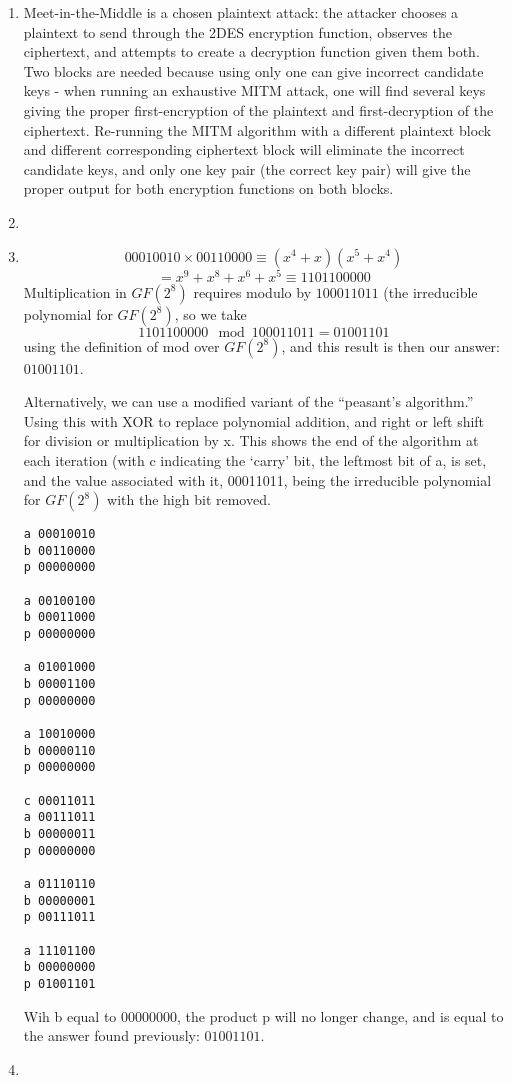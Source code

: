\documentclass[12pt,letterpaper]{article}
\begin{document}
\pagestyle{fancy}
\rhead{\today}

\begin{enumerate}

    \item
        Meet-in-the-Middle is a chosen plaintext attack: the attacker chooses a plaintext to send through the 2DES encryption function, observes the ciphertext, and attempts to create a decryption function given them both.
        Two blocks are needed because using only one can give incorrect candidate keys - when running an exhaustive MITM attack, one will find several keys giving the proper first-encryption of the plaintext and first-decryption of the ciphertext.
        Re-running the MITM algorithm with a different plaintext block and different corresponding ciphertext block will eliminate the incorrect candidate keys, and only one key pair (the correct key pair) will give the proper output for both encryption functions on both blocks.

    \item

    \item
    $$00010010 \times 00110000 \equiv (x^4 + x)(x^5 + x^4)$$
    $$ = x^9 + x^8 + x^6 + x^5 \equiv 1101100000$$
    Multiplication in $GF(2^8)$ requires modulo by $100011011$ (the irreducible polynomial for $GF(2^8)$, so we take
    $$1101100000 \mod 100011011 = 01001101$$
    using the definition of mod over $GF(2^8)$, and this result is then our answer: $01001101$.

    Alternatively, we can use a modified variant of the ``peasant's algorithm.''  Using this with XOR to replace polynomial addition, and right or left shift for division or multiplication by x.  This shows the end of the algorithm at each iteration (with c indicating the `carry' bit, the leftmost bit of a, is set, and the value associated with it, 00011011, being the irreducible polynomial for $GF(2^8)$ with the high bit removed.
\begin{verbatim}
a 00010010
b 00110000
p 00000000

a 00100100
b 00011000
p 00000000

a 01001000
b 00001100
p 00000000

a 10010000
b 00000110
p 00000000

c 00011011
a 00111011
b 00000011
p 00000000

a 01110110
b 00000001
p 00111011

a 11101100
b 00000000
p 01001101
\end{verbatim}
    Wih b equal to $00000000$, the product p will no longer change, and is equal to the answer found previously: $01001101$.

    \item


\end{enumerate}
\end{document}
